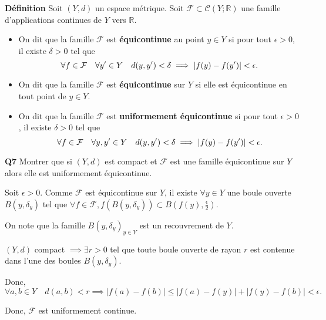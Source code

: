 \documentclass[french]{article}
\begin{document}
	\begin{tcolorbox}[colback=yellow!5!white,colframe=yellow!75!black]
		\textbf{\large{Définition}} Soit $(Y,d)$ un espace métrique. Soit $\mathcal{F} \subset \mathcal{C}(Y; \mathbb{R})$ une famille d'applications continues de $Y$ vers $\mathbb{R}$.
		\begin{itemize}
			\item On dit que la famille $\mathcal{F}$ est \textbf{équicontinue} au point $y \in Y$ si pour tout $\epsilon > 0$, il existe $\delta > 0$ tel que
			\[\forall f \in \mathcal{F} \quad \forall y\sp{\prime} \in Y \quad d(y,y\sp{\prime}) < \delta \implies |f(y) - f(y\sp{\prime})| < \epsilon.\]
			\item On dit que la famille $\mathcal{F}$ est \textbf{équicontinue} sur $Y$ si elle est équicontinue en tout point de $y \in Y$.
			\item On dit que la famille $\mathcal{F}$ est \textbf{uniformement équicontinue} si pour tout $\epsilon > 0$, il existe $\delta > 0$ tel que
				\[\forall f \in \mathcal{F} \quad \forall y,y\sp{\prime} \in Y \quad d(y,y\sp{\prime}) < \delta \implies |f(y) - f(y\sp{\prime})| < \epsilon.\]
		\end{itemize}
	\end{tcolorbox}

	\begin{tcolorbox}[colback=gray!5!white,colframe=gray!75!black]
		\textbf{\large{Q7}} Montrer que si $(Y,d)$ est compact et $\mathcal{F}$ est une famille équicontinue sur $Y$ alors elle est uniformement équicontinue.
	\end{tcolorbox}

	Soit $\epsilon > 0$. Comme $\mathcal{F}$ est équicontinue sur $Y$, il existe $\forall y \in Y$ une boule ouverte $B(y, \delta_y)$ tel que $\forall f \in \mathcal{F}, f(B(y, \delta_y)) \subset B(f(y), \frac{\epsilon}{2})$.
	
	On note que la famille $B(y, \delta_y)_{y \in Y}$ est un recouvrement de $Y$.
	
	$(Y,d)$ compact $\implies \exists r>0$ tel que toute boule ouverte de rayon $r$ est contenue dans l'une des boules $B(y, \delta_y)$.
	
	Donc,
	\[\forall a,b \in Y \quad d(a, b) < r \implies |f(a) - f(b)| \leq |f(a) - f(y)| + |f(y) - f(b)| < \epsilon. \]
	
	Donc, $\mathcal{F}$ est uniformement continue.
	
\end{document}
